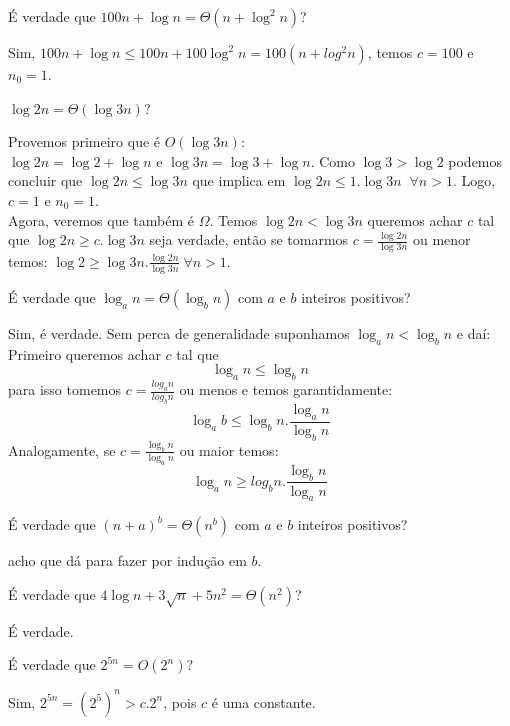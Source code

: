 \documentclass{exam}
\begin{document}
\begin{questions}
		\question É verdade que $100n + \log n = \Theta(n + \log^2 n)$?
		\begin{solution}
			Sim, $100n + \log n \le 100n + 100 \log^2 n = 100(n + log^2 n)$, temos
			$c = 100$ e $n_0 = 1$. 
		\end{solution}
	
		\question $\log 2n = \Theta(\log 3n)$?
		\begin{solution}
			Provemos primeiro que é $O(\log 3n)$:\\
			$\log 2n = \log 2 + \log n$ e $\log 3n = \log 3 + \log n$. Como $\log 3 > \log 2$ podemos concluir que
			$\log 2n \le \log 3n$ que implica em $\log 2n \le 1. \log 3n \;\; \forall n > 1$. Logo, $c = 1$ e $n_0 = 1$.\\
			Agora, veremos que também é $\Omega$. Temos $\log 2n < \log 3n$ queremos achar $c$ tal que $\log 2n \ge c . \log 3n$ 
			seja verdade, então se tomarmos $c = \frac{\log 2n}{\log 3n}$ ou menor temos: $\log 2 \ge \log 3n. \frac{\log 2n}{\log 3n}
			\; \forall n > 1$.
		\end{solution}
	
		\question É verdade que $\log_a n = \Theta(\log_b n)$ com $a$ e $b$ inteiros positivos?
		\begin{solution}
			Sim, é verdade. Sem perca de generalidade suponhamos $\log_a n < \log_b n $ e daí:
			Primeiro queremos achar $c$ tal que $$\log_a n \le \log_b n$$ para isso tomemos
			$c = \frac{log_a n }{log_b n}$ ou menos e temos garantidamente:
			$$\log_a b \le \log_b n.\frac{\log_a n}{\log_b n}$$
			Analogamente, se $c = \frac{\log_b n}{\log_a n}$ ou maior temos: 
			$$\log_a n \ge log_b n. \frac{\log_b n}{\log_a n}$$ 
			
			
		\end{solution}

		\question É verdade que $(n + a)^b = \Theta(n^b)$ com $a$ e $b$ inteiros positivos?
		\begin{solution}
			acho que dá para fazer por indução em $b$.
		\end{solution}
	
		\question É verdade que $4 \log n + 3 \sqrt{n} + 5n^2 = \Theta(n^2)$?
		\begin{solution}
			É verdade.
		\end{solution}
	
		\question É verdade que $2^{5n} = O(2^n)$?
		\begin{solution}
			Sim, $2^{5n} = (2^5)^n > c.2^n$, pois $c$ é uma constante. 
		\end{solution}







\end{questions}
		
\end{document}
